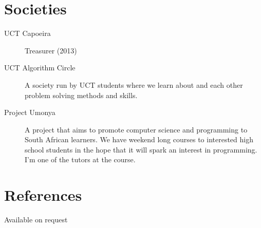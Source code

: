 \documentclass[margin,line,a4paper]{resume}
\begin{document}
\begin{resume}
        \section{\mysidestyle Societies}
            \begin{description}
                \item [UCT Capoeira] Treasurer (2013)
                \item [UCT Algorithm Circle] A society run by UCT students where we learn about and
                each other problem solving methods and skills.

                \item [Project Umonya] A project that aims to promote computer science and programming
                to South African learners. We have weekend long courses to interested high school students
                in the hope that it will spark an interest in programming. I'm one of the tutors at the course.
            \end{description}

        \section{\mysidestyle References}
            Available on request
    \end{resume}
\end{document}
